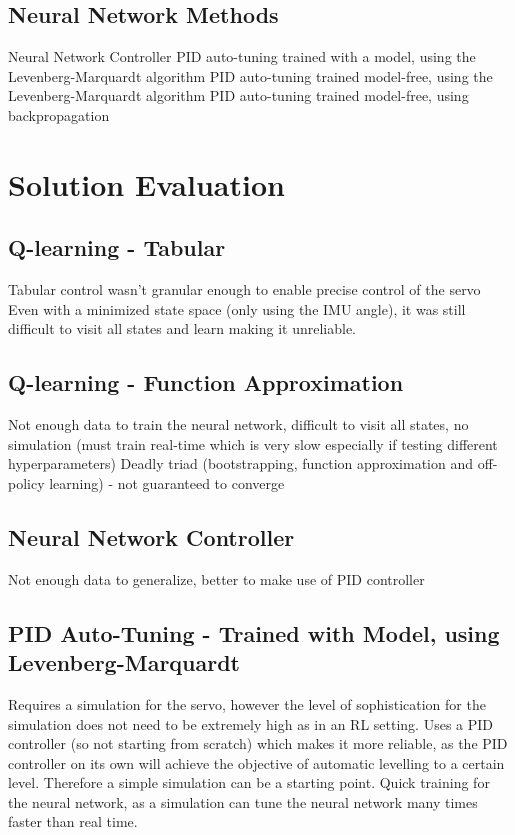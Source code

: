 \documentclass[letterpaper,12pt]{article}
\begin{document}
\subsection{Neural Network Methods}
Neural Network Controller
PID auto-tuning trained with a model, using the Levenberg-Marquardt algorithm
PID auto-tuning trained model-free, using the Levenberg-Marquardt algorithm
PID auto-tuning trained model-free, using backpropagation

\section{Solution Evaluation}
\subsection{Q-learning - Tabular}
Tabular control wasn't granular enough to enable precise control of the servo
Even with a minimized state space (only using the IMU angle), it was still difficult to visit all states and learn making it unreliable.
\subsection{Q-learning - Function Approximation}
Not enough data to train the neural network, difficult to visit all states, no simulation (must train real-time which is very slow especially if testing different hyperparameters)
Deadly triad (bootstrapping, function approximation and off-policy learning) - not guaranteed to converge

\subsection{Neural Network Controller}
Not enough data to generalize, better to make use of PID controller
\subsection{PID Auto-Tuning - Trained with Model, using Levenberg-Marquardt}
Requires a simulation for the servo, however the level of sophistication for the simulation does not need to be extremely high as in an RL setting. Uses a PID controller (so not starting from scratch) which makes it more reliable, as the PID controller on its own will achieve the objective of automatic levelling to a certain level. Therefore a simple simulation can be a starting point.
Quick training for the neural network, as a simulation can tune the neural network many times faster than real time.
\end{document}
